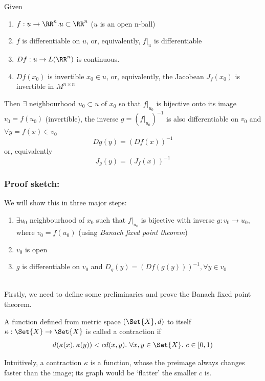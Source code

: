 \begin{thm}
  \label{thm:InvFT}
  Given
  \begin{enumerate}
  \item $f: u \to \RR^n. u \subset \RR^n$ ($u$ is an open n-ball)
  \item $f$ is differentiable on $u$, or, equivalently, $f|_u$ is differentiable
  \item $Df: u \to L(\RR^n)$ is continuous.
  \item $Df(x_0)$ is invertible $x_0 \in u$, or, equivalently, the Jacobean $J_f(x_0)$ is invertible in $M^{n\times n}$
  \end{enumerate}
  Then $\exists$ neighbourhood $u_0 \subset u$ of $x_0$ so that $f|_{u_0}$ is bijective onto its image $v_0 = f(u_0)$ (invertible), the inverse $g = (f|_{u_0})^{-1}$ is also differentiable on $v_0$ and $\forall y = f(x) \in v_0$
  $$Dg(y) = (Df(x))^{-1}$$
  or, equivalently
  $$J_g(y) = (J_f(x))^{-1}$$
\end{thm}

\subsubsection*{Proof sketch:}
We will show this in three major steps: 
\begin{enumerate}[I]
\item $\exists u_0$ neighbourhood of $x_0$ such that $f|_{u_0}$ is bijective with inverse $g: v_0 \rightarrow u_0$, where $v_0 = f(u_0)$ (using \emph{Banach fixed point theorem})
\item $v_0$ is open
\item $g$ is differentiable on $v_0$ and $D_g(y) = (Df(g(y)))^{-1}, \forall y \in v_0$
\end{enumerate}
\ \\

Firstly, we need to define some preliminaries and prove the Banach fixed point theorem. 


\begin{defn}
  A function defined from metric space $(\Set{X}, d)$ to itself $\kappa: \Set{X} \rightarrow \Set{X}$ is called a contraction if
  $$d(\kappa(x), \kappa(y)) < cd(x,y).\ \forall x, y \in \Set{X}.\ c \in [0, 1)$$
\end{defn}

\begin{rem}
  Intuitively, a contraction $\kappa$ is a function, whose the preimage always changes faster than the image; its graph would be `flatter' the smaller $c$ is.
\end{rem}

